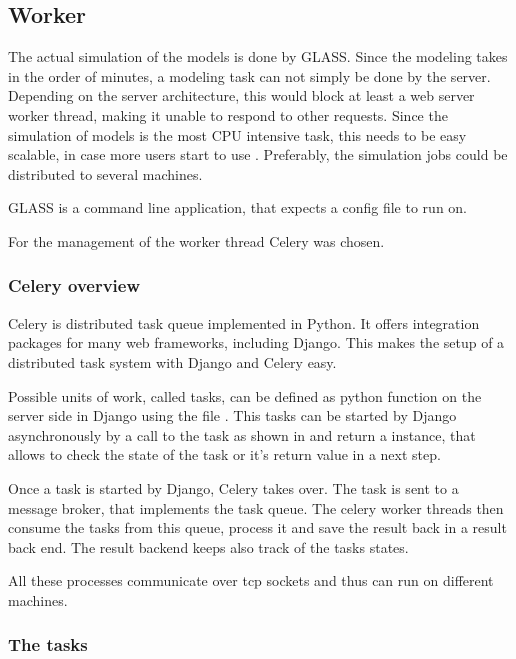 \subsection{Worker}
\label{sec:worker}

The actual simulation of the models is done by GLASS.
Since the modeling takes in the order of minutes, a modeling task can not simply be done by the server.
Depending on the server architecture, this would block at least a web server worker thread, making it unable to respond to other requests.
Since the simulation of models is the most CPU intensive task, this needs to be easy scalable, in case more users start to use \spl. 
Preferably, the simulation jobs could be distributed to several machines.

GLASS is a command line application, that expects a config file to run on.

For the management of the worker thread Celery was chosen.


\subsubsection{Celery overview}
Celery is distributed task queue implemented in Python.
It offers integration packages for many web frameworks, including Django.
This makes the setup of a distributed task system with Django and Celery easy.


Possible units of work, called tasks, can be defined as python function on the server side in Django using the file .
This tasks can be started by Django asynchronously by a call to the task as shown in  and return a  instance, that allows to check the state of the task or it's return value in a next step.

Once a task is started by Django, Celery takes over.
The task is sent to a message broker, that implements the task queue.
The celery worker threads then consume the tasks from this queue, process it and save the result back in a result back end. The result backend keeps also track of the tasks states.

All these processes communicate over tcp sockets and thus can run on different machines.

\subsubsection{The tasks}

